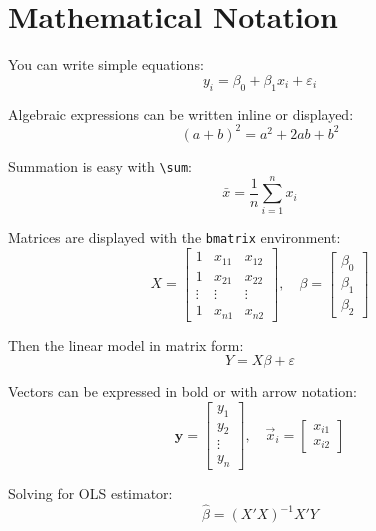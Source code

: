 
\section{Mathematical Notation}

You can write simple equations:
\begin{equation}
y_i = \beta_0 + \beta_1 x_i + \varepsilon_i
\end{equation}

Algebraic expressions can be written inline or displayed:
\[
(a + b)^2 = a^2 + 2ab + b^2
\]

Summation is easy with \texttt{\textbackslash sum}:
\[
\bar{x} = \frac{1}{n} \sum_{i=1}^{n} x_i
\]

Matrices are displayed with the \texttt{bmatrix} environment:
\[
X = 
\begin{bmatrix}
1 & x_{11} & x_{12} \\
1 & x_{21} & x_{22} \\
\vdots & \vdots & \vdots \\
1 & x_{n1} & x_{n2}
\end{bmatrix}, \quad
\beta =
\begin{bmatrix}
\beta_0 \\ \beta_1 \\ \beta_2
\end{bmatrix}
\]

Then the linear model in matrix form:
\[
Y = X \beta + \varepsilon
\]

Vectors can be expressed in bold or with arrow notation:
\[
\mathbf{y} =
\begin{bmatrix}
y_1 \\ y_2 \\ \vdots \\ y_n
\end{bmatrix}, \quad
\vec{x}_i =
\begin{bmatrix}
x_{i1} \\ x_{i2}
\end{bmatrix}
\]

Solving for OLS estimator:
\[
\hat{\beta} = (X'X)^{-1} X'Y
\]
